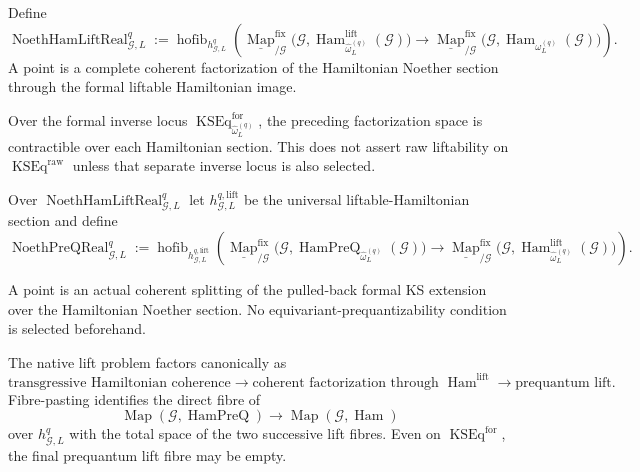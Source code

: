 \begin{definition}
\label{def:prequantum-noether-liftable-hamiltonian-realization}
Define
\[
\boxed{
\operatorname{NoethHamLiftReal}_{\mathcal G,L}^{q}
:=
\operatorname{hofib}_{h_{\mathcal G,L}^{q}}
\left(
\underline{\operatorname{Map}}^{\mathrm{fix}}_{/\mathcal G}
\bigl(\mathcal G,
      \operatorname{Ham}^{\mathrm{lift}}_{\widehat\omega_L^{(q)}}(\mathcal G)\bigr)
\longrightarrow
\underline{\operatorname{Map}}^{\mathrm{fix}}_{/\mathcal G}
\bigl(\mathcal G,
      \operatorname{Ham}_{\omega_L^{(q)}}(\mathcal G)\bigr)
\right).
}
\]
A point is a complete coherent factorization of the Hamiltonian Noether section
through the formal liftable Hamiltonian image.
\end{definition}

Over the formal inverse locus
$\operatorname{KSEq}^{\mathrm{for}}_{\widehat\omega_L^{(q)}}$, the preceding
factorization space is contractible over each Hamiltonian section.  This does not
assert raw liftability on
$\operatorname{KSEq}^{\mathrm{raw}}$ unless that separate inverse locus is also
selected.

\begin{definition}
\label{def:prequantum-noether-lift-realization}
Over $\operatorname{NoethHamLiftReal}_{\mathcal G,L}^{q}$ let
$h_{\mathcal G,L}^{q,\mathrm{lift}}$ be the universal liftable-Hamiltonian
section and define
\[
\boxed{
\operatorname{NoethPreQReal}_{\mathcal G,L}^{q}
:=
\operatorname{hofib}_{h_{\mathcal G,L}^{q,\mathrm{lift}}}
\left(
\underline{\operatorname{Map}}^{\mathrm{fix}}_{/\mathcal G}
\bigl(\mathcal G,
      \operatorname{HamPreQ}_{\widehat\omega_L^{(q)}}(\mathcal G)\bigr)
\longrightarrow
\underline{\operatorname{Map}}^{\mathrm{fix}}_{/\mathcal G}
\bigl(\mathcal G,
      \operatorname{Ham}^{\mathrm{lift}}_{\widehat\omega_L^{(q)}}(\mathcal G)\bigr)
\right).
}
\]
\end{definition}

A point is an actual coherent splitting of the pulled-back formal KS extension
over the Hamiltonian Noether section.  No equivariant-prequantizability condition
is selected beforehand.

\begin{proposition}
\label{prop:prequantum-noether-liftability-image}
The native lift problem factors canonically as
\[
\boxed{
\text{transgressive Hamiltonian coherence}
\longrightarrow
\text{coherent factorization through }\operatorname{Ham}^{\mathrm{lift}}
\longrightarrow
\text{prequantum lift}.
}
\]
Fibre-pasting identifies the direct fibre of
\[
\operatorname{Map}(\mathcal G,\operatorname{HamPreQ})
\longrightarrow
\operatorname{Map}(\mathcal G,\operatorname{Ham})
\]
over $h_{\mathcal G,L}^q$ with the total space of the two successive lift fibres.
Even on $\operatorname{KSEq}^{\mathrm{for}}$, the final prequantum lift fibre may
be empty.
\end{proposition}

